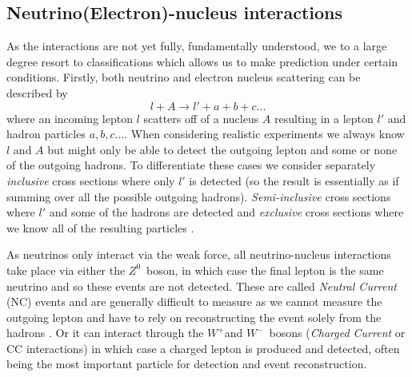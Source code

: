 \documentclass[a4paper,12pt]{article}
\newcommand{\Zz}{$Z^0$}
\newcommand{\Wp}{$W^+$}
\newcommand{\Wm}{$W^-$}
\begin{document}


\subsection{Neutrino(Electron)-nucleus interactions}
As the interactions are not yet fully, fundamentally understood, we to a large degree resort to classifications which allows us to make prediction under certain conditions.
Firstly, both neutrino and electron nucleus scattering can be described by
\begin{equation}
    l + A \rightarrow l' + a + b + c ...
\end{equation}
where an incoming lepton $l$ scatters off of a nucleus $A$ resulting in a lepton $l'$ and hadron particles $a, b, c ...$.
When considering realistic experiments we always know $l$ and $A$ but might only be able to detect the outgoing lepton and some or none of the outgoing hadrons. 
To differentiate these cases we consider separately \emph{inclusive} cross sections where only $l'$ is detected (so the result is essentially as if summing over all the possible outgoing hadrons).
\emph{Semi-inclusive} cross sections where $l'$ and some of the hadrons are detected and \emph{exclusive} cross sections where we know all of the resulting particles \cite{amaroElectronNeutrinonucleusScattering2020}.

As neutrinos only interact via the weak force, all neutrino-nucleus interactions take place via either the \Zz\ boson, in which case the final lepton is the same neutrino and so these events are not detected.
These are called \emph{Neutral Current} (NC) events and are generally difficult to measure as we cannot measure the outgoing lepton and have to rely on reconstructing the event solely from the hadrons \cite{giustiNeutralCurrentNeutrinonucleus2020}.
Or it can interact through the \Wp and \Wm\ bosons (\emph{Charged Current} or CC interactions) in which case a charged lepton is produced and detected, often being the most important particle for detection and event reconstruction.
\end{document}
